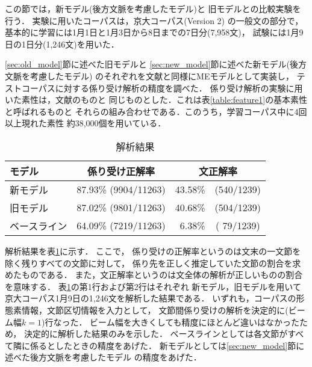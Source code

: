 この節では，新モデル(後方文脈を考慮したモデル)と
旧モデルとの比較実験を行う．
実験に用いたコーパスは，京大コーパス(Version 2)
\cite{kurohashi:nlp97} の一般文の部分で，
基本的に学習には1月1日と1月3日から8日までの7日分(7,958文)，
試験には1月9日の1日分(1,246文)を用いた．

\ref{sec:old_model}節に述べた旧モデルと
\ref{sec:new_model}節に述べた新モデル(後方文脈を考慮したモデル)
のそれぞれを文献\cite{Uchimoto:ipsj99}と同様にMEモデルとして実装し，
テストコーパスに対する係り受け解析の精度を調べた．
係り受け解析の実験に用いた素性は，文献\cite{Uchimoto:ipsj99}のものと
同じものとした．これは表\ref{table:feature1}の基本素性と呼ばれるものと
それらの組み合わせである．このうち，学習コーパス中に4回以上現れた素性
約38,000個を用いている．

\begin{table}[htbp]
  \begin{center}
    \caption{解析結果}
    \label{Result} 
    \begin{tabular}{|l@{ }|c@{ }|r@{}c@{ }|}
      \hline
      モデル & 係り受け正解率 & \multicolumn{2}{c|}{文正解率}\\
      \hline      
      新モデル & 87.93\% (9904/11263) & 43.58\% & (540/1239) \\
      旧モデル & 87.02\% (9801/11263) & 40.68\% & (504/1239) \\
      ベースライン & 64.09\% (7219/11263) & 6.38\% & ( 79/1239)\\
      \hline
    \end{tabular}
  \end{center}
\end{table}

解析結果を表\ref{Result}に示す．
ここで，
係り受けの正解率というのは文末の一文節を除く残りすべての文節に対して，
係り先を正しく推定していた文節の割合を求めたものである．
また，文正解率というのは文全体の解析が正しいものの割合を意味する．
表\ref{Result}の第1行および第2行はそれぞれ
新モデル，旧モデルを用いて
京大コーパス1月9日の\mbox{1,246}文を解析した結果である．
いずれも，コーパスの形態素情報，文節区切情報を入力として，
文節間係り受けの解析を決定的に(ビーム幅$k=1$)行なった．
ビーム幅を大きくしても精度にほとんど違いはなかったため，
決定的に解析した結果のみを示した．
ベースラインとしては各文節がすべて隣に係るとしたときの精度をあげた．
新モデルとしては\ref{sec:new_model}節に述べた後方文脈を考慮したモデル
の精度をあげた．

